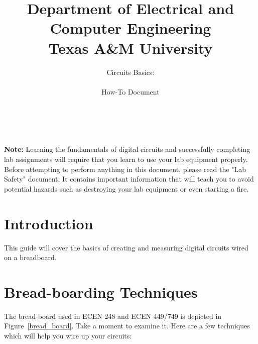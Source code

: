 \documentclass[11pt,twoside,titlepage]{article}
\title{ \huge Department of Electrical and Computer Engineering \\ \huge Texas A\&M University}
\author{ \huge Circuits Basics:\\ \\ \huge How-To Document\\ \\ \\ \ta}
\date{}
\begin{document}

\maketitle

\noindent
\textbf{Note:} Learning the fundamentals of digital circuits and successfully completing lab assignments will require that you learn to use your lab equipment properly. Before attempting to perform anything in this document, please read the "Lab Safety" document. It contains important information that will teach you to avoid potential hazards such as destroying your lab equipment or even starting a fire.\\

\section{Introduction}
This guide will cover the basics of creating and measuring digital circuits wired on a breadboard.

\section{Bread-boarding Techniques}
The bread-board used in ECEN 248 and ECEN 449/749 is depicted in Figure~\ref{bread_board}. Take a moment to examine it. Here are a few techniques which will help you wire up your circuits:
\end{document}
